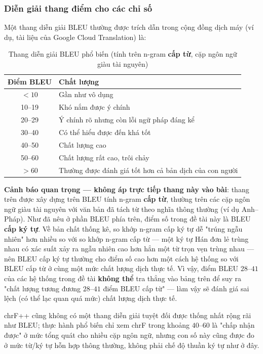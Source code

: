 \subsubsection{Diễn giải thang điểm cho các chỉ số}

Một thang diễn giải BLEU thường được trích dẫn trong cộng đồng dịch máy (ví dụ, tài
liệu của Google Cloud Translation) là:

\begin{table}[H]
\centering\small
\caption{Thang diễn giải BLEU phổ biến (tính trên n-gram \textbf{cấp từ}, cặp ngôn ngữ
giàu tài nguyên)}
\begin{tabular}{cl}
\toprule
\textbf{Điểm BLEU} & \textbf{Chất lượng} \\
\midrule
$<10$ & Gần như vô dụng \\
10--19 & Khó nắm được ý chính \\
20--29 & Ý chính rõ nhưng còn lỗi ngữ pháp đáng kể \\
30--40 & Có thể hiểu được đến khá tốt \\
40--50 & Chất lượng cao \\
50--60 & Chất lượng rất cao, trôi chảy \\
$>60$ & Thường được đánh giá tốt hơn cả bản dịch của con người \\
\bottomrule
\end{tabular}
\end{table}

\textbf{Cảnh báo quan trọng — không áp trực tiếp thang này vào bài}: thang trên được xây
dựng trên BLEU tính n-gram \textbf{cấp từ}, thường trên các cặp ngôn ngữ giàu tài nguyên
với văn bản đã tách từ theo nghĩa thông thường (ví dụ Anh--Pháp). Như đã nêu ở phần BLEU
phía trên, điểm số trong đề tài này là BLEU \textbf{cấp ký tự}. Về bản chất thống kê, so
khớp n-gram cấp ký tự dễ "trúng ngẫu nhiên" hơn nhiều so với so khớp n-gram cấp từ — một
ký tự Hán đơn lẻ trùng nhau có xác suất xảy ra ngẫu nhiên cao hơn hẳn một từ trọn vẹn
trùng nhau — nên BLEU cấp ký tự thường cho điểm số cao hơn một cách hệ thống so với BLEU
cấp từ ở cùng một mức chất lượng dịch thực tế. Vì vậy, điểm BLEU $28$--$41$ của các hệ
thống trong đề tài \textbf{không thể} tra thẳng vào bảng trên để suy ra "chất lượng
tương đương $28$--$41$ điểm BLEU cấp từ" — làm vậy sẽ đánh giá sai lệch (có thể lạc quan
quá mức) chất lượng dịch thực tế.

chrF++ cũng không có một thang diễn giải tuyệt đối được thống nhất rộng rãi như BLEU;
thực hành phổ biến chỉ xem chrF trong khoảng $40$--$60$ là "chấp nhận được" ở mức tổng
quát cho nhiều cặp ngôn ngữ, nhưng con số này cũng được đo ở mức từ/ký tự hỗn hợp thông
thường, không phải chế độ thuần ký tự như ở đây.


